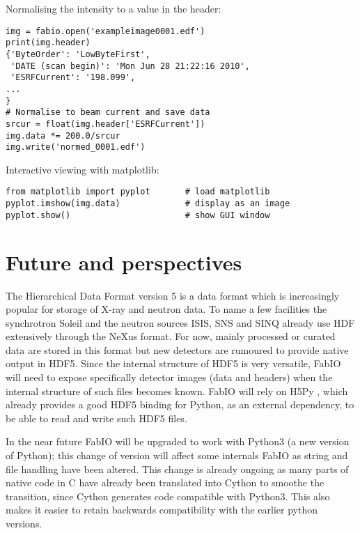 \documentclass[preprint ]{iucr}
\begin{document}
Normalising the intensity to a value in the header:\\
\begin{verbatim}
img = fabio.open('exampleimage0001.edf')
print(img.header)
{'ByteOrder': 'LowByteFirst',
 'DATE (scan begin)': 'Mon Jun 28 21:22:16 2010',
 'ESRFCurrent': '198.099',
...
}
# Normalise to beam current and save data
srcur = float(img.header['ESRFCurrent'])
img.data *= 200.0/srcur
img.write('normed_0001.edf')
\end{verbatim}

Interactive viewing with matplotlib:\\
\begin{verbatim}
from matplotlib import pyplot       # load matplotlib 
pyplot.imshow(img.data)             # display as an image
pyplot.show()                       # show GUI window
\end{verbatim}


\section{Future and perspectives}
The Hierarchical Data Format version 5 \cite{hdf5} is a data format which is
increasingly popular for storage of X-ray and neutron data. To name a few
facilities the synchrotron Soleil\cite{tub05} and the neutron sources
ISIS, SNS and SINQ already use HDF extensively through the NeXus\cite{nexus} format.
For now, mainly processed or curated data are stored in this format but new detectors are
rumoured to provide native output in HDF5.
Since the internal structure of HDF5 is very versatile, FabIO will need to expose 
specifically detector images (data and headers) when the internal structure 
of such files becomes known. FabIO will rely on H5Py \cite{h5py}, which already
provides a good HDF5 binding for Python, as an external dependency, to be able
to read and write such HDF5 files.

In the near future FabIO will be upgraded to work with Python3 (a new version of 
Python); this change of version will affect some internals FabIO as string and 
file handling have been altered.
This change is already ongoing as many parts of native code in C have already
been translated into Cython \cite{cython} to smoothe the transition, since 
Cython generates code compatible with Python3. 
This also makes it easier to retain backwards compatibility with the earlier
python versions. %
\end{document}
